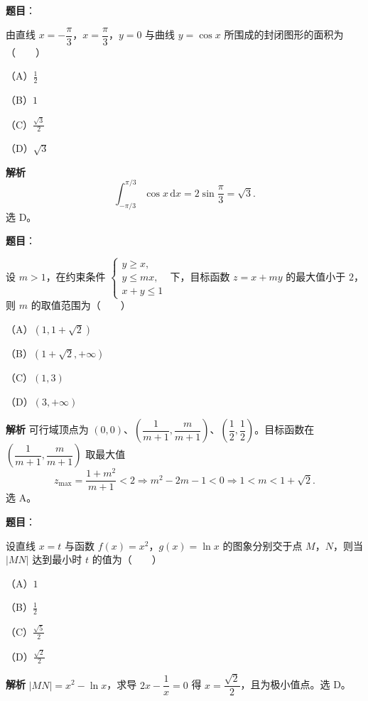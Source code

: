 \begin{answer}

\textbf{题目}：

由直线 $x=-\dfrac\pi3$，$x=\dfrac\pi3$，$y=0$ 与曲线 $y=\cos x$ 所围成的封闭图形的面积为\mbox{（　　）}

（A）$\frac12$

（B）$1$

（C）$\frac{\sqrt3}2$

（D）$\sqrt3$

\textbf{解析}
\nopagebreak[4]
\[\int_{-\pi/3}^{\pi/3}\cos x\,\mathrm dx=2\sin\frac\pi3=\sqrt3.\]
选 D。


\end{answer}
\begin{answer}

\textbf{题目}：

设 $m>1$，在约束条件 $\begin{cases}y\geqslant x,\\y\leqslant mx,\\x+y\leqslant1\end{cases}$ 下，目标函数 $z=x+my$ 的最大值小于 $2$，则 $m$ 的取值范围为\mbox{（　　）}

（A）$(1,1+\sqrt2)$

（B）$(1+\sqrt2,+\infty)$

（C）$(1,3)$

（D）$(3,+\infty)$

\textbf{解析}
可行域顶点为 $(0,0)$、$\left(\dfrac1{m+1},\dfrac m{m+1}\right)$、$\left(\dfrac12,\dfrac12\right)$。目标函数在 $\left(\dfrac1{m+1},\dfrac m{m+1}\right)$ 取最大值
\nopagebreak[4]
\[z_{\max}=\frac{1+m^2}{m+1}<2\Longrightarrow m^2-2m-1<0\Longrightarrow1<m<1+\sqrt2.\]
选 A。


\end{answer}
\begin{answer}

\textbf{题目}：

设直线 $x=t$ 与函数 $f(x)=x^2$，$g(x)=\ln x$ 的图象分别交于点 $M$，$N$，则当 $|MN|$ 达到最小时 $t$ 的值为\mbox{（　　）}

（A）$1$

（B）$\frac12$

（C）$\frac{\sqrt5}2$

（D）$\frac{\sqrt2}2$

\textbf{解析}
$|MN|=x^2-\ln x$，求导 $2x-\dfrac1x=0$ 得 $x=\dfrac{\sqrt2}2$，且为极小值点。选 D。


\end{answer}
